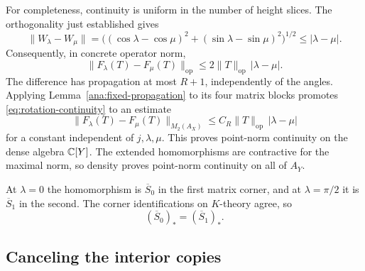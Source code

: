 For completeness, continuity is uniform in the number of height
slices.  The orthogonality just established gives
\[
 \|W_\lambda-W_\mu\|
  =\bigl((\cos\lambda-\cos\mu)^2
            +(\sin\lambda-\sin\mu)^2\bigr)^{1/2}
  \le |\lambda-\mu|.
\]
Consequently, in concrete operator norm,
\begin{equation}\label{eq:rotation-continuity}
 \|F_\lambda(T)-F_\mu(T)\|_{\mathrm{op}}
       \le2\|T\|_{\mathrm{op}}\,|\lambda-\mu|.
\end{equation}
The difference has propagation at most $R+1$, independently of the
angles.  Applying Lemma~\ref{ana:fixed-propagation} to its four matrix
blocks promotes \eqref{eq:rotation-continuity} to an estimate
\[
 \|F_\lambda(T)-F_\mu(T)\|_{M_2(A_X)}
       \le C_R\|T\|_{\mathrm{op}}\,|\lambda-\mu|
\]
for a constant independent of $j,\lambda,\mu$.
This proves point-norm continuity on the dense algebra $\mathbb C[Y]$.
The extended homomorphisms are contractive for the maximal norm, so
density proves point-norm continuity on all of $A_Y$.

At $\lambda=0$ the homomorphism is $\overline S_0$ in the first
matrix corner, and at $\lambda=\pi/2$ it is $\overline S_1$ in the
second.  The corner identifications on $K$-theory agree, so
\begin{equation}\label{eq:equal-stacks}
 (\overline S_0)_*=(\overline S_1)_*.
\end{equation}

\subsection{Canceling the interior copies}

